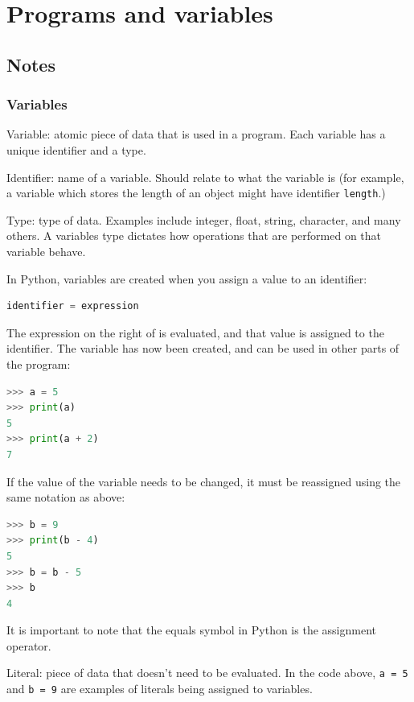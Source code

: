 \documentclass[a4paper]{report}
\begin{document}
\chapter{Programs and variables}

\section{Notes}

\subsection{Variables}

Variable: atomic piece of data that is used in a program. Each variable has a
unique identifier and a type.

Identifier: name of a variable. Should relate to what the variable is (for
example, a variable which stores the length of an object might have identifier
\texttt{length}.)

Type: type of data. Examples include integer, float, string, character, and
many others. A variables type dictates how operations that are performed on
that variable behave.

In Python, variables are created when you assign a value to an identifier:

\begin{lstlisting}[language=Python]
identifier = expression
\end{lstlisting}

The expression on the right of is evaluated, and that value is assigned to
the identifier. The variable has now been created, and can be used in other
parts of the program:

\begin{lstlisting}[language=Python]
>>> a = 5
>>> print(a)
5
>>> print(a + 2)
7
\end{lstlisting}

If the value of the variable needs to be changed, it must be reassigned using
the same notation as above:

\begin{lstlisting}[language=Python]
>>> b = 9
>>> print(b - 4)
5
>>> b = b - 5
>>> b
4
\end{lstlisting}

It is important to note that the equals symbol in Python is the assignment
operator.

Literal: piece of data that doesn't need to be evaluated. In the code
above, \texttt{a = 5} and \texttt{b = 9} are examples of literals being
assigned to variables.
\end{document}
